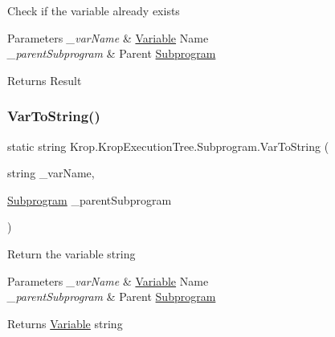 Check if the variable already exists 


\begin{DoxyParams}{Parameters}
{\em \+\_\+var\+Name} & \mbox{\hyperlink{namespace_krop_1_1_krop_execution_tree_1_1_variable}{Variable}} Name\\
\hline
{\em \+\_\+parent\+Subprogram} & Parent \mbox{\hyperlink{class_krop_1_1_krop_execution_tree_1_1_subprogram}{Subprogram}}\\
\hline
\end{DoxyParams}
\begin{DoxyReturn}{Returns}
Result
\end{DoxyReturn}
\mbox{\label{class_krop_1_1_krop_execution_tree_1_1_subprogram_abd8a129fb5f66a36c676c766561ffdea}} 
\subsubsection{\texorpdfstring{Var\+To\+String()}{VarToString()}}
{\footnotesize\ttfamily static string Krop.\+Krop\+Execution\+Tree.\+Subprogram.\+Var\+To\+String (\begin{DoxyParamCaption}\item[{string}]{\+\_\+var\+Name,  }\item[{\mbox{\hyperlink{class_krop_1_1_krop_execution_tree_1_1_subprogram}{Subprogram}}}]{\+\_\+parent\+Subprogram }\end{DoxyParamCaption})\hspace{0.3cm}{\ttfamily [static]}}



Return the variable string 


\begin{DoxyParams}{Parameters}
{\em \+\_\+var\+Name} & \mbox{\hyperlink{namespace_krop_1_1_krop_execution_tree_1_1_variable}{Variable}} Name\\
\hline
{\em \+\_\+parent\+Subprogram} & Parent \mbox{\hyperlink{class_krop_1_1_krop_execution_tree_1_1_subprogram}{Subprogram}}\\
\hline
\end{DoxyParams}
\begin{DoxyReturn}{Returns}
\mbox{\hyperlink{namespace_krop_1_1_krop_execution_tree_1_1_variable}{Variable}} string
\end{DoxyReturn}


